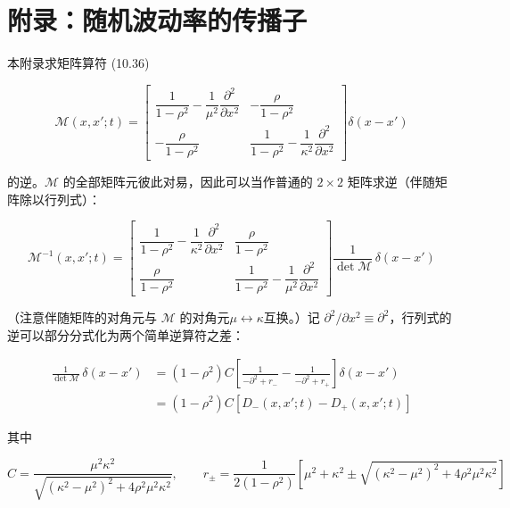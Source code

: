 \section{附录：随机波动率的传播子}

本附录求矩阵算符 (10.36)

\begin{equation*}
\mathcal{M}(x,x';t)=
\begin{bmatrix}
\dfrac{1}{1-\rho^2}-\dfrac{1}{\mu^2}\dfrac{\partial^2}{\partial x^2} & -\dfrac{\rho}{1-\rho^2}\\[8pt]
-\dfrac{\rho}{1-\rho^2} & \dfrac{1}{1-\rho^2}-\dfrac{1}{\kappa^2}\dfrac{\partial^2}{\partial x^2}
\end{bmatrix}\delta(x-x')
\tag{10.72}
\end{equation*}

的逆。$\mathcal{M}$ 的全部矩阵元彼此对易，因此可以当作普通的 $2\times2$ 矩阵求逆（伴随矩阵除以行列式）：

\begin{equation*}
\mathcal{M}^{-1}(x,x';t)=
\begin{bmatrix}
\dfrac{1}{1-\rho^2}-\dfrac{1}{\kappa^2}\dfrac{\partial^2}{\partial x^2} & \dfrac{\rho}{1-\rho^2}\\[8pt]
\dfrac{\rho}{1-\rho^2} & \dfrac{1}{1-\rho^2}-\dfrac{1}{\mu^2}\dfrac{\partial^2}{\partial x^2}
\end{bmatrix}\frac{1}{\det\mathcal{M}}\,\delta(x-x')
\end{equation*}

（注意伴随矩阵的对角元与 $\mathcal{M}$ 的对角元$\mu\leftrightarrow\kappa$互换。）记 $\partial^2/\partial x^2\equiv\partial^2$，行列式的逆可以部分分式化为两个简单逆算符之差：

\begin{equation*}
\begin{aligned}
\frac{1}{\det\mathcal{M}}\,\delta(x-x')
&=(1-\rho^2)C\left[\frac{1}{-\partial^2+r_-}-\frac{1}{-\partial^2+r_+}\right]\delta(x-x')\\
&=(1-\rho^2)C\left[D_-(x,x';t)-D_+(x,x';t)\right]
\end{aligned}
\end{equation*}

其中

\begin{equation*}
C=\frac{\mu^2\kappa^2}{\sqrt{(\kappa^2-\mu^2)^2+4\rho^2\mu^2\kappa^2}},\qquad
r_\pm=\frac{1}{2(1-\rho^2)}\left[\mu^2+\kappa^2\pm\sqrt{(\kappa^2-\mu^2)^2+4\rho^2\mu^2\kappa^2}\right]
\end{equation*}

